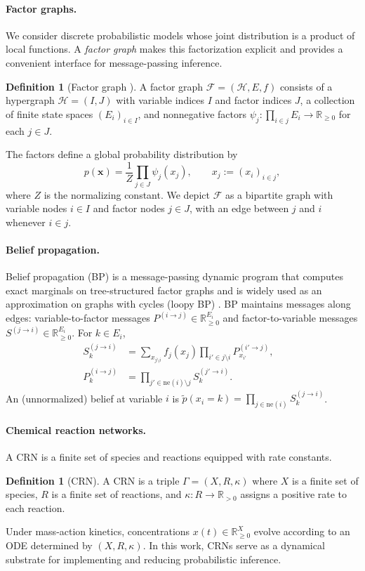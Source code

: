 \documentclass{article}
\theoremstyle{plain}
\theoremstyle{definition}
\newtheorem{definition}[theorem]{Definition}
\theoremstyle{remark}
\newcommand{\<}{\langle}
\renewcommand{\>}{\rangle}
\begin{document}
\paragraph{Factor graphs.}
We consider discrete probabilistic models whose joint distribution is a product of local functions.
A \emph{factor graph} makes this factorization explicit and provides a convenient interface for message-passing inference.
\begin{definition}[Factor graph \cite{NIPS2000_61b1fb3f}]
A factor graph $\mathcal{F}=(\mathcal{H},E,f)$ consists of a hypergraph $\mathcal{H}=(I,J)$ with variable indices $I$ and factor indices $J$,
a collection of finite state spaces $(E_i)_{i\in I}$, and nonnegative factors
$\psi_j:\prod_{i\in j}E_i\to \mathbb{R}_{\ge 0}$ for each $j\in J$.
\end{definition}
The factors define a global probability distribution by
\[
p(\mathbf{x})=\frac{1}{Z}\prod_{j\in J} \psi_j(x_j),
\qquad x_j := (x_i)_{i\in j},
\]
where $Z$ is the normalizing constant. We depict $\mathcal F$ as a bipartite graph with variable nodes $i\in I$ and factor nodes $j\in J$,
with an edge between $j$ and $i$ whenever $i\in j$.

\paragraph{Belief propagation.}
Belief propagation (BP) is a message-passing dynamic program that computes exact marginals on tree-structured factor graphs and is widely used as an approximation on graphs with cycles (loopy BP) \cite{NIPS2000_61b1fb3f}.
BP maintains messages along edges: variable-to-factor messages $P^{(i\to j)}\in \mathbb{R}_{\ge 0}^{E_i}$ and factor-to-variable messages $S^{(j\to i)}\in \mathbb{R}_{\ge 0}^{E_i}$.
For $k\in E_i$,
\begin{align*}
S^{(j\to i)}_k
&=\sum_{x_{j\setminus i}} f_j(x_j)\prod_{i'\in j\setminus i} P^{(i'\to j)}_{x_{i'}},
&
\\ P^{(i\to j)}_k
&=\prod_{j'\in \mathrm{ne}(i)\setminus j} S^{(j'\to i)}_k .
\end{align*}
An (unnormalized) belief at variable $i$ is \newline $\tilde p(x_i=k)=\prod_{j\in \mathrm{ne}(i)} S^{(j\to i)}_k$.

\paragraph{Chemical reaction networks.}
A CRN is a finite set of species and reactions equipped with rate constants.
\begin{definition}[CRN]
A CRN is a triple $\Gamma=(X,R,\kappa)$ where $X$ is a finite set of species, $R$ is a finite set of reactions, and $\kappa:R\to\mathbb{R}_{>0}$ assigns a positive rate to each reaction.
\end{definition}
Under mass-action kinetics, concentrations $x(t)\in \mathbb{R}_{\ge 0}^{X}$ evolve according to an ODE  determined by $(X,R,\kappa)$.
In this work, CRNs serve as a dynamical substrate for implementing and reducing probabilistic inference.
\end{document}
